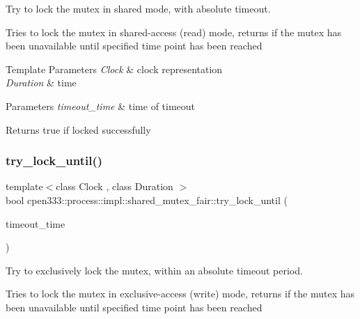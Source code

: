 Try to lock the mutex in shared mode, with absolute timeout. 

Tries to lock the mutex in shared-\/access (read) mode, returns if the mutex has been unavailable until specified time point has been reached


\begin{DoxyTemplParams}{Template Parameters}
{\em Clock} & clock representation \\
\hline
{\em Duration} & time \\
\hline
\end{DoxyTemplParams}

\begin{DoxyParams}{Parameters}
{\em timeout\+\_\+time} & time of timeout \\
\hline
\end{DoxyParams}
\begin{DoxyReturn}{Returns}
true if locked successfully 
\end{DoxyReturn}
\mbox{\label{classcpen333_1_1process_1_1impl_1_1shared__mutex__fair_ab8acef917db5784868e439a26a72343b}} 
\subsubsection{\texorpdfstring{try\+\_\+lock\+\_\+until()}{try\_lock\_until()}}
{\footnotesize\ttfamily template$<$class Clock , class Duration $>$ \\
bool cpen333\+::process\+::impl\+::shared\+\_\+mutex\+\_\+fair\+::try\+\_\+lock\+\_\+until (\begin{DoxyParamCaption}\item[{const std\+::chrono\+::time\+\_\+point$<$ Clock, Duration $>$ \&}]{timeout\+\_\+time }\end{DoxyParamCaption})\hspace{0.3cm}{\ttfamily [inline]}}



Try to exclusively lock the mutex, within an absolute timeout period. 

Tries to lock the mutex in exclusive-\/access (write) mode, returns if the mutex has been unavailable until specified time point has been reached


